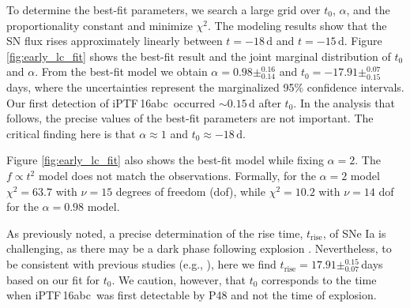 \documentclass[twocolumn]{aastex61}
\newcommand{\abc}{iPTF\,16abc}
\begin{document}
To determine the best-fit parameters, we search a large grid over $t_0$,
$\alpha$, and the proportionality constant and minimize $\chi^2$. The
modeling results show that the SN flux rises approximately linearly between
$t=-18\,\mathrm{d}$ and $t=-15\,\mathrm{d}$. Figure \ref{fig:early_lc_fit}
shows the best-fit result and the joint marginal distribution of $t_0$ and
$\alpha$. From the best-fit model we obtain $\alpha=0.98 \pm ^{0.16}_{0.14}$
and $t_0=-17.91 \pm ^{0.07}_{0.15}$\,days, where the uncertainties represent
the marginalized 95\% confidence intervals. Our first detection of \abc\
occurred $\sim$${0.15}\,\textrm{d}$ after $t_0$. In the analysis that
follows, the precise values of the best-fit parameters are not important.
The critical finding here is that $\alpha \approx 1$ and $t_0 \approx -18 \,
\mathrm{d}$.

Figure \ref{fig:early_lc_fit} also shows the best-fit model while fixing
$\alpha = 2$. The $f \propto t^2$ model does not match the observations.
Formally, for the $\alpha = 2$ model $\chi^2 = 63.7$ with $\nu = 15$ degrees
of freedom (dof), while $\chi^2 = 10.2$ with $\nu = 14$ dof for the $\alpha =
0.98$ model.

As previously noted, a precise determination of the rise time,
$t_\mathrm{rise}$, of SNe Ia is challenging, as there may be a dark phase
following explosion \citep{2014ApJ...784...85P}. Nevertheless, to be
consistent with previous studies (e.g., \citealt{2011MNRAS.416.2607G}), here
we find $t_\mathrm{rise} = 17.91\pm _{0.07}^{0.15}$\,days based on our fit
for $t_0$. We caution, however, that $t_0$ corresponds to the time when
\abc\ was first detectable by P48 and not the time of explosion.
\end{document}
